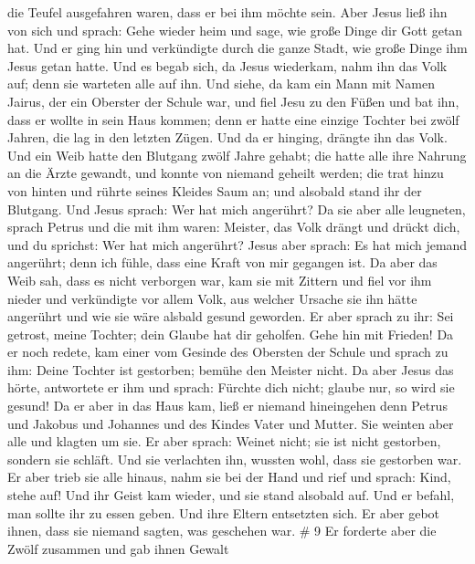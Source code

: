 die Teufel ausgefahren waren, dass er bei ihm möchte sein. Aber Jesus
ließ ihn von sich und sprach:  Gehe wieder heim und sage,
wie große Dinge dir Gott getan hat. Und er ging hin und verkündigte
durch die ganze Stadt, wie große Dinge ihm Jesus getan hatte.
 Und es begab sich, da Jesus wiederkam, nahm ihn das Volk
auf; denn sie warteten alle auf ihn.  Und siehe, da kam ein
Mann mit Namen Jairus, der ein Oberster der Schule war, und fiel Jesu zu
den Füßen und bat ihn, dass er wollte in sein Haus kommen; 
denn er hatte eine einzige Tochter bei zwölf Jahren, die lag in den
letzten Zügen. Und da er hinging, drängte ihn das Volk. 
Und ein Weib hatte den Blutgang zwölf Jahre gehabt; die hatte alle ihre
Nahrung an die Ärzte gewandt, und konnte von niemand geheilt werden;
 die trat hinzu von hinten und rührte seines Kleides Saum
an; und alsobald stand ihr der Blutgang.  Und Jesus sprach:
Wer hat mich angerührt? Da sie aber alle leugneten, sprach Petrus und
die mit ihm waren: Meister, das Volk drängt und drückt dich, und du
sprichst: Wer hat mich angerührt?  Jesus aber sprach: Es
hat mich jemand angerührt; denn ich fühle, dass eine Kraft von mir
gegangen ist.  Da aber das Weib sah, dass es nicht
verborgen war, kam sie mit Zittern und fiel vor ihm nieder und
verkündigte vor allem Volk, aus welcher Ursache sie ihn hätte angerührt
und wie sie wäre alsbald gesund geworden.  Er aber sprach
zu ihr: Sei getrost, meine Tochter; dein Glaube hat dir geholfen. Gehe
hin mit Frieden!  Da er noch redete, kam einer vom Gesinde
des Obersten der Schule und sprach zu ihm: Deine Tochter ist gestorben;
bemühe den Meister nicht.  Da aber Jesus das hörte,
antwortete er ihm und sprach: Fürchte dich nicht; glaube nur, so wird
sie gesund!  Da er aber in das Haus kam, ließ er niemand
hineingehen denn Petrus und Jakobus und Johannes und des Kindes Vater
und Mutter.  Sie weinten aber alle und klagten um sie. Er
aber sprach: Weinet nicht; sie ist nicht gestorben, sondern sie schläft.
 Und sie verlachten ihn, wussten wohl, dass sie gestorben
war.  Er aber trieb sie alle hinaus, nahm sie bei der Hand
und rief und sprach: Kind, stehe auf!  Und ihr Geist kam
wieder, und sie stand alsobald auf. Und er befahl, man sollte ihr zu
essen geben.  Und ihre Eltern entsetzten sich. Er aber
gebot ihnen, dass sie niemand sagten, was geschehen war. \# 9
 Er forderte aber die Zwölf zusammen und gab ihnen Gewalt
